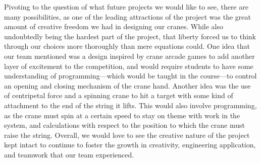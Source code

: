 \documentclass[letterpaper, 12pt]{article}
\begin{document}
Pivoting to the question of what future projects we would like to see, there are many possibilities, as one of the leading attractions of the project was the great amount of creative freedom we had in designing our cranes. 
While also undoubtedly being the hardest part of the project, that liberty forced us to think through our choices more thoroughly than mere equations could. 
One idea that our team mentioned was a design inspired by crane arcade games to add another layer of excitement to the competition, and would require students to have some understanding of programming—which would be taught in the course—to control an opening and closing mechanism of the crane hand. 
Another idea was the use of centripetal force and a spinning crane to hit a target with some kind of attachment to the end of the string it lifts. 
This would also involve programming, as the crane must spin at a certain speed to stay on theme with work in the system, and calculations with respect to the position to which the crane must raise the string. 
Overall, we would love to see the creative nature of the project kept intact to continue to foster the growth in creativity, engineering application, and teamwork that our team experienced.
\end{document}
